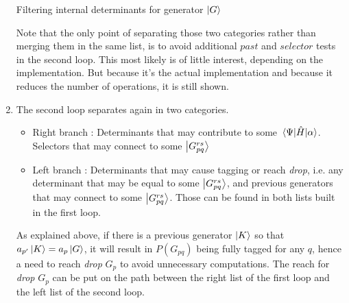 \documentclass[./thesis.tex]{subfiles}
\begin{document}
\begin{enumerate}
\begin{algorithm}
\caption{Filtering internal determinants for generator $\ket G$}
\label{alg:generators_filtering}

\end{algorithm}



Note that the only point of separating those two categories rather than merging them in the same list, is to avoid additional $past$ and $selector$ tests in the second loop.
This most likely is of little interest, depending on the implementation.
But because it's the actual implementation and because it reduces the number of operations, it is still shown.

\item
The second loop separates again in two categories.

\begin{itemize}
\item
Right branch : Determinants that may contribute to some $\mel{\Psi}{\hat{H}}{\alpha}$. Selectors that may connect to some $\ket {G_{pq}^{rs}}$
\item
Left branch : Determinants that may cause tagging or reach \emph{drop}, i.e. any determinant that may be equal to some $\ket {G_{pq}^{rs}}$, and previous generators that may connect to some $\ket {G_{pq}^{rs}}$. Those can be found in both lists built in the first loop.
\end{itemize}

As explained above, if there is a previous generator $\ket K$ so that $a_{p'} \ket K = a_p \ket G$, it will result in $P(G_{pq})$ being fully tagged for any $q$, hence a need to reach \emph{drop} $G_p$ to avoid unnecessary computations.
The reach for \emph{drop} $G_p$ can be put on the path between the right list of the first loop and the left list of the second loop.


\end{enumerate}
\end{document}
